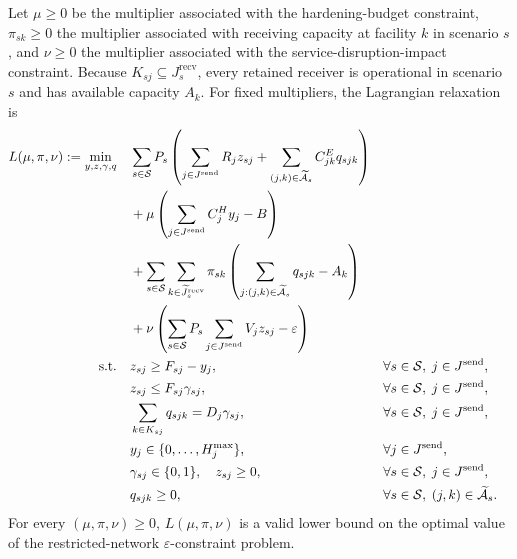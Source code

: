 \documentclass[preprint,11pt,authoryear]{elsarticle}
\begin{document}
Let $\mu\geq0$ be the multiplier associated with the hardening-budget
constraint, $\pi_{sk}\geq0$ the multiplier associated with receiving capacity
at facility $k$ in scenario $s$, and $\nu\geq0$ the multiplier associated
with the service-disruption-impact constraint. Because
$K_{sj}\subseteq J_s^{\mathrm{recv}}$, every retained receiver is operational
in scenario $s$ and has available capacity $A_k$. For fixed multipliers, the
Lagrangian relaxation is
\begin{align*}
L(\mu,\pi,\nu)
:=
\min_{y,z,\gamma,q}\quad
&
\sum_{s\in\mathcal S}P_s
\left(
\sum_{j\in J^{\mathrm{send}}}R_jz_{sj}
+
\sum_{(j,k)\in\widetilde{\mathcal A}_s}
C_{jk}^Eq_{sjk}
\right)
\notag\\
&+
\mu
\left(
\sum_{j\in J^{\mathrm{send}}}C_j^Hy_j-B
\right)
\notag\\
&+
\sum_{s\in\mathcal S}
\sum_{k\in\widetilde J_s^{\mathrm{recv}}}
\pi_{sk}
\left(
\sum_{j:(j,k)\in\widetilde{\mathcal A}_s}q_{sjk}
-A_k
\right)
\notag\\
&+
\nu
\left(
\sum_{s\in\mathcal S}P_s
\sum_{j\in J^{\mathrm{send}}}V_jz_{sj}
-\varepsilon
\right)
\\
\text{s.t.}\quad
&
z_{sj}\geq F_{sj}-y_j,
&&
\forall s\in\mathcal S,\;
j\in J^{\mathrm{send}},
\notag\\
&
z_{sj}\leq F_{sj}\gamma_{sj},
&&
\forall s\in\mathcal S,\;
j\in J^{\mathrm{send}},
\notag\\
&
\sum_{k\in K_{sj}}q_{sjk}
=
D_j\gamma_{sj},
&&
\forall s\in\mathcal S,\;
j\in J^{\mathrm{send}},
\notag\\
&
y_j\in\{0,\ldots,H_j^{\max}\},
&&
\forall j\in J^{\mathrm{send}},
\notag\\
&
\gamma_{sj}\in\{0,1\},\quad z_{sj}\geq0,
&&
\forall s\in\mathcal S,\;
j\in J^{\mathrm{send}},
\notag\\
&
q_{sjk}\geq0,
&&
\forall s\in\mathcal S,\;
(j,k)\in\widetilde{\mathcal A}_s.
\notag
\end{align*}
For every $(\mu,\pi,\nu)\geq0$, $L(\mu,\pi,\nu)$ is a valid lower bound on
the optimal value of the restricted-network $\varepsilon$-constraint problem.
\end{document}

